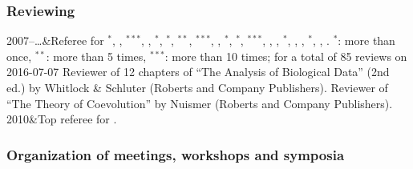 \documentclass[11pt, a4paper]{article}
\begin{document}
\subsubsection*{Reviewing}

\begin{mytabular}
2007--\dots &Referee for $^*$, , $^{***}$, , $^{*}$, $^{*}$, $^{**}$, $^{***}$, , $^{*}$, $^{*}$, $^{***}$, , , $^*$, , , $^{*}$, , .\vspace{0.25em}\newline
{\scriptsize $^{*}$: more than once, $^{**}$: more than 5 times, $^{***}$: more than 10 times; for a total of 85 reviews on 2016-07-07 }\newline
%
Reviewer of 12 chapters of ``The Analysis of Biological Data'' (2nd ed.) by Whitlock \& Schluter (Roberts and Company Publishers). \newline
Reviewer of ``The Theory of Coevolution'' by Nuismer (Roberts and Company Publishers). \\
%
2010&Top referee for .
\end{mytabular}

\subsubsection*{Organization of meetings, workshops and symposia}
\end{document}
